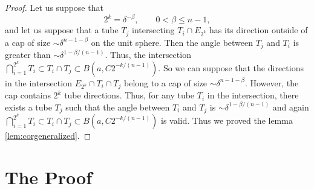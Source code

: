 \documentclass[11pt, letterpaper]{nyjm}
\begin{document}
	\begin{proof}
		Let us suppose that
		\[
		2^k=\delta^{-\beta},
		\qquad 0<\beta\leq n-1,
		\]
		and let us suppose that a tube $T_j$ intersecting
		$T_i\cap E_{2^k}$ has its direction outside of a cap of size
		$\sim\delta^{n-1-\beta}$ on the unit sphere. Then the angle between
		$T_j$ and $T_i$ is greater than $\sim\delta^{1-\beta/(n-1)}$.
		Thus, the intersection 
		$\bigcap_{i=1}^{2^k}T_i \subset T_i \cap T_j \subset B(a,C2^{-k/(n-1)}).$ 
		So we can suppose that the directions in the intersection
		$E_{2^k}\cap T_i\cap T_j$ belong to a cap of size
		$\sim\delta^{n-1-\beta}$. However, the cap contains $2^k$ tube
		directions. 
		Thus, for any tube $T_i$ in the intersection, there exists
		a tube $T_j$ such that the angle between $T_i$ and $T_j$ is
		$\sim\delta^{1-\beta/(n-1)}$ and again \\ $\bigcap_{i=1}^{2^k}T_i \subset T_i \cap T_j \subset B(a,C2^{-k/(n-1)})$ is valid.
		Thus we proved the lemma \ref{lem:corgeneralized}.
		
		
	\end{proof}
	
	
	
	\section{The Proof}
	
\end{document}

